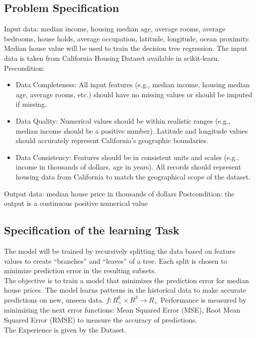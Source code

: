 \documentclass[a4paper, 11pt]{article}
\begin{document}
\subsection*{Problem Specification}

Input data: median income, housing median age, average rooms, average bedrooms, house holds, average occupation, latitude, longitude, ocean proximity. Median house value will be used to train the decision tree regression.
The input data is taken from California Housing Dataset available in scikit-learn. 
\newline
Precondition:
\begin{itemize}
\item Data Completeness: All input features (e.g., median income, housing median age, average rooms, etc.) should have no missing values or should be imputed if missing.
\item Data Quality: Numerical values should be within realistic ranges (e.g., median income should be a positive number).
Latitude and longitude values should accurately represent California’s geographic boundaries.
\item Data Consistency: Features should be in consistent units and scales (e.g., income in thousands of dollars, age in years).
All records should represent housing data from California to match the geographical scope of the dataset.
\end{itemize}

Output data: median house price in thousands of dollars
 Postcondition: the output is a continuous positive numerical value

\subsection*{Specification of the learning Task}
The model will be trained by recursively splitting the data based on feature values to create “branches” and “leaves” of a tree. Each split is chosen to minimize prediction error in the resulting subsets.\\ 
The objective is to train a model that minimizes the prediction error for median house prices. The model learns patterns in the historical data to make accurate predictions on new, unseen data.
$f: R_+^6 \times R^3 \rightarrow R_+$ \newline
Performance is measured by minimizing the next error functions: Mean Squared Error (MSE), Root Mean Squared Error (RMSE) to measure the accuracy of predictions.\\
The Experience is given by the Dataset.
\end{document}
